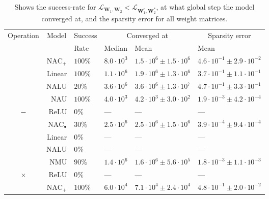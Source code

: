 \begin{table}[H]

\caption{\label{tab:function-task-static-defaults}Shows the success-rate for $\mathcal{L}_{\mathbf{W}_1, \mathbf{W}_2} < \mathcal{L}_{\mathbf{W}_1^\epsilon, \mathbf{W}_2^*}$, at what global step the model converged at, and the sparsity error for all weight matrices.}
\centering
\begin{tabular}{crllll}
\toprule
\multicolumn{1}{c}{Operation} & \multicolumn{1}{c}{Model} & \multicolumn{1}{c}{Success} & \multicolumn{2}{c}{Converged at} & \multicolumn{1}{c}{Sparsity error} \\
\cmidrule(l{3pt}r{3pt}){1-1} \cmidrule(l{3pt}r{3pt}){2-2} \cmidrule(l{3pt}r{3pt}){3-3} \cmidrule(l{3pt}r{3pt}){4-5} \cmidrule(l{3pt}r{3pt}){6-6}
 &  & Rate & Median & Mean & Mean\\
\midrule
 & $\mathrm{NAC}_{+}$ & $100\%$ & $8.0 \cdot 10^{3}$ & $1.5 \cdot 10^{6} \pm 1.5 \cdot 10^{6}$ & $4.6 \cdot 10^{-1} \pm 2.9 \cdot 10^{-2}$\\

 & Linear & $100\%$ & $1.1 \cdot 10^{6}$ & $1.9 \cdot 10^{6} \pm 1.3 \cdot 10^{6}$ & $3.7 \cdot 10^{-1} \pm 1.1 \cdot 10^{-1}$\\

 & NALU & $20\%$ & $3.6 \cdot 10^{6}$ & $3.6 \cdot 10^{6} \pm 1.3 \cdot 10^{7}$ & $4.7 \cdot 10^{-1} \pm 3.3 \cdot 10^{-1}$\\

 & NAU & $100\%$ & $4.0 \cdot 10^{3}$ & $4.2 \cdot 10^{3} \pm 3.0 \cdot 10^{2}$ & $1.9 \cdot 10^{-3} \pm 4.2 \cdot 10^{-4}$\\

\multirow{-5}{*}{\centering\arraybackslash $\bm{-}$} & ReLU & $0\%$ & --- & --- & ---\\
\cmidrule{1-6}
 & $\mathrm{NAC}_{\bullet}$ & $30\%$ & $2.5 \cdot 10^{6}$ & $2.5 \cdot 10^{6} \pm 1.5 \cdot 10^{6}$ & $3.9 \cdot 10^{-4} \pm 9.4 \cdot 10^{-4}$\\

 & Linear & $0\%$ & --- & --- & ---\\

 & NALU & $0\%$ & --- & --- & ---\\

 & NMU & $90\%$ & $1.4 \cdot 10^{6}$ & $1.6 \cdot 10^{6} \pm 5.6 \cdot 10^{5}$ & $1.8 \cdot 10^{-3} \pm 1.1 \cdot 10^{-3}$\\

\multirow{-5}{*}{\centering\arraybackslash $\bm{\times}$} & ReLU & $0\%$ & --- & --- & ---\\
\cmidrule{1-6}
 & $\mathrm{NAC}_{+}$ & $100\%$ & $6.0 \cdot 10^{4}$ & $7.1 \cdot 10^{4} \pm 2.4 \cdot 10^{4}$ & $4.8 \cdot 10^{-1} \pm 2.0 \cdot 10^{-2}$\\


\end{tabular}
\end{table}
